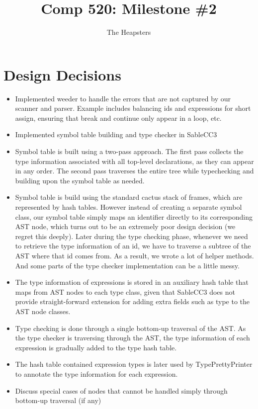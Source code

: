 \documentclass{article}
\title{Comp 520: Milestone \#2}
\author{The Heapsters}
\date{}
\begin{document}
\maketitle

\section{Design Decisions}

\begin{itemize}
\item Implemented weeder to handle the errors that are not captured by our scanner and parser. Example includes balancing ids and expressions for short assign, ensuring that break and continue only appear in a loop, etc.
\item Implemented symbol table building and type checker in SableCC3
\item Symbol table is built using a two-pass approach. The first pass collects the type information associated with all top-level declarations, as they can appear in any order. The second pass traverses the entire tree while typechecking and building upon the symbol table as needed.
\item Symbol table is build using the standard cactus stack of frames, which are represented by hash tables. However instead of creating a separate symbol class, our symbol table simply maps an identifier directly to its corresponding AST node, which turns out to be an extremely poor design decision (we regret this deeply). Later during the type checking phase, whenever we need to retrieve the type information of an id, we have to traverse a subtree of the AST where that id comes from. As a result, we wrote a lot of helper methods. And some parts of the type checker implementation can be a little messy.
\item The type information of expressions is stored in an auxiliary hash table that maps from AST nodes to each type class, given that SableCC3 does not provide straight-forward extension for adding extra fields such as type to the AST node classes.
\item Type checking is done through a single bottom-up traversal of the AST. As the type checker is traversing through the AST, the type information of each expression is gradually added to the type hash table.
\item The hash table contained expression types is later used by TypePrettyPrinter to annotate the type information for each expression.
\item Discuss special cases of nodes that cannot be handled simply through bottom-up traversal (if any)
\end{itemize}
\end{document}
